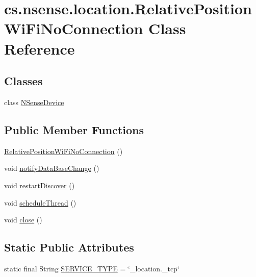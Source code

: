 \hypertarget{classcs_1_1nsense_1_1location_1_1_relative_position_wi_fi_no_connection}{\section{cs.\-nsense.\-location.\-Relative\-Position\-Wi\-Fi\-No\-Connection Class Reference}
\label{classcs_1_1nsense_1_1location_1_1_relative_position_wi_fi_no_connection}
}
\subsection*{Classes}
\begin{DoxyCompactItemize}
\item 
class \hyperlink{classcs_1_1nsense_1_1location_1_1_relative_position_wi_fi_no_connection_1_1_n_sense_device}{N\-Sense\-Device}
\end{DoxyCompactItemize}
\subsection*{Public Member Functions}
\begin{DoxyCompactItemize}
\item 
\hyperlink{classcs_1_1nsense_1_1location_1_1_relative_position_wi_fi_no_connection_aeb77bb3a13912408babf2ef0e0073f36}{Relative\-Position\-Wi\-Fi\-No\-Connection} ()
\item 
void \hyperlink{classcs_1_1nsense_1_1location_1_1_relative_position_wi_fi_no_connection_a2c982536017ff67799401cb23b8416e4}{notify\-Data\-Base\-Change} ()
\item 
void \hyperlink{classcs_1_1nsense_1_1location_1_1_relative_position_wi_fi_no_connection_a55d5e754e2aeaacf6efcdc6add3ab4ff}{restart\-Discover} ()
\item 
void \hyperlink{classcs_1_1nsense_1_1location_1_1_relative_position_wi_fi_no_connection_a44694429948cd084e3653074682cb035}{schedule\-Thread} ()
\item 
void \hyperlink{classcs_1_1nsense_1_1location_1_1_relative_position_wi_fi_no_connection_aa57e6cbce545897aac3d2277c4c9565b}{close} ()
\end{DoxyCompactItemize}
\subsection*{Static Public Attributes}
\begin{DoxyCompactItemize}
\item 
static final String \hyperlink{classcs_1_1nsense_1_1location_1_1_relative_position_wi_fi_no_connection_aaba705c3a023dc1e728a8e85bf1956cf}{S\-E\-R\-V\-I\-C\-E\-\_\-\-T\-Y\-P\-E} = \char`\"{}\-\_\-location.\-\_\-tcp\char`\"{}
\end{DoxyCompactItemize}
